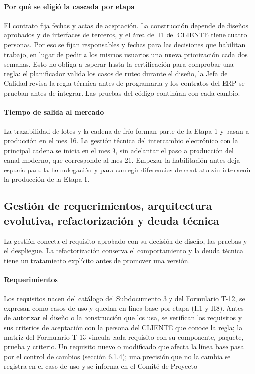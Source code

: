 \paragraph{Por qué se eligió la cascada por etapa}
El contrato fija fechas y actas de aceptación. La construcción depende de diseños aprobados y de interfaces de terceros, y el área de TI del CLIENTE tiene cuatro personas. Por eso se fijan responsables y fechas para las decisiones que habilitan trabajo, en lugar de pedir a los mismos usuarios una nueva priorización cada dos semanas. Esto no obliga a esperar hasta la certificación para comprobar una regla: el planificador valida los casos de ruteo durante el diseño, la Jefa de Calidad revisa la regla térmica antes de programarla y los contratos del ERP se prueban antes de integrar. Las pruebas del código continúan con cada cambio.

\paragraph{Tiempo de salida al mercado}
La trazabilidad de lotes y la cadena de frío forman parte de la Etapa 1 y pasan a producción en el mes 16. La gestión técnica del intercambio electrónico con la principal cadena se inicia en el mes 9, sin adelantar el paso a producción del canal moderno, que corresponde al mes 21. Empezar la habilitación antes deja espacio para la homologación y para corregir diferencias de contrato sin intervenir la producción de la Etapa 1.

\subsection{Gestión de requerimientos, arquitectura evolutiva, refactorización y deuda técnica}

La gestión conecta el requisito aprobado con su decisión de diseño, las pruebas y el despliegue. La refactorización conserva el comportamiento y la deuda técnica tiene un tratamiento explícito antes de promover una versión.

\paragraph{Requerimientos} Los requisitos nacen del catálogo del Subdocumento 3 y del Formulario T-12, se expresan como casos de uso y quedan en línea base por etapa (H1 y H8). Antes de autorizar el diseño o la construcción que los usa, se verifican los requisitos y sus criterios de aceptación con la persona del CLIENTE que conoce la regla; la matriz del Formulario T-13 vincula cada requisito con su componente, paquete, prueba y criterio. Un requisito nuevo o modificado que afecta la línea base pasa por el control de cambios (sección 6.1.4); una precisión que no la cambia se registra en el caso de uso y se informa en el Comité de Proyecto.

